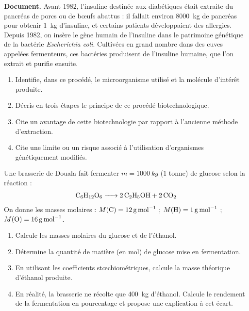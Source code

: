 \documentclass[11pt]{article}
\begin{document}
\begin{exercice}
\textbf{Document.} Avant 1982, l'insuline destinée aux diabétiques était extraite du pancréas de porcs ou de bœufs abattus : il fallait environ \SI{8000}{kg} de pancréas pour obtenir \SI{1}{kg} d'insuline, et certains patients développaient des allergies. Depuis 1982, on insère le gène humain de l'insuline dans le patrimoine génétique de la bactérie \emph{Escherichia coli}. Cultivées en grand nombre dans des cuves appelées fermenteurs, ces bactéries produisent de l'insuline humaine, que l'on extrait et purifie ensuite.

\begin{enumerate}
\item Identifie, dans ce procédé, le microorganisme utilisé et la molécule d'intérêt produite.
\item Décris en trois étapes le principe de ce procédé biotechnologique.
\item Cite un avantage de cette biotechnologie par rapport à l'ancienne méthode d'extraction.
\item Cite une limite ou un risque associé à l'utilisation d'organismes génétiquement modifiés.
\end{enumerate}
\end{exercice}

\begin{exercice}
Une brasserie de Douala fait fermenter $m = \SI{1000}{kg}$ (1 tonne) de glucose selon la réaction :
\[ \ce{C6H12O6 -> 2 C2H5OH + 2 CO2} \]
On donne les masses molaires : $M(\ce{C}) = \SI{12}{g.mol^{-1}}$ ; $M(\ce{H}) = \SI{1}{g.mol^{-1}}$ ; $M(\ce{O}) = \SI{16}{g.mol^{-1}}$.
\begin{enumerate}
\item Calcule les masses molaires du glucose et de l'éthanol.
\item Détermine la quantité de matière (en mol) de glucose mise en fermentation.
\item En utilisant les coefficients stœchiométriques, calcule la masse théorique d'éthanol produite.
\item En réalité, la brasserie ne récolte que \SI{400}{kg} d'éthanol. Calcule le rendement de la fermentation en pourcentage et propose une explication à cet écart.
\end{enumerate}
\end{exercice}
\end{document}
